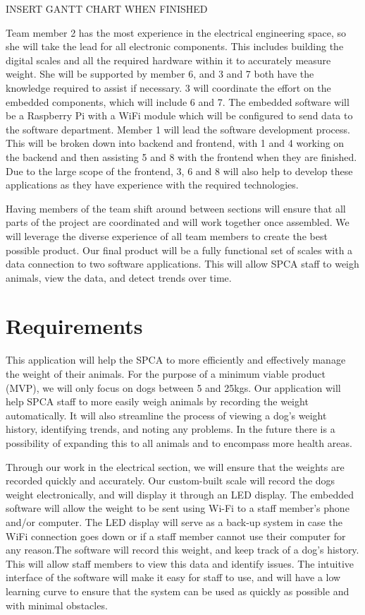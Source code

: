 INSERT GANTT CHART WHEN FINISHED

Team member 2 has the most experience in the electrical engineering space, so she will take the lead for all electronic components. This includes building the digital scales and all the required hardware within it to accurately measure weight. She will be supported by member 6, and 3 and 7 both have the knowledge required to assist if necessary. 3 will coordinate the effort on the embedded components, which will include 6 and 7. The embedded software will be a Raspberry Pi with a WiFi module which will be configured to send data to the software department. Member 1 will lead the software development process. This will be broken down into backend and frontend, with 1 and 4 working on the backend and then assisting 5 and 8 with the frontend when they are finished. Due to the large scope of the frontend, 3, 6 and 8 will also help to develop these applications as they have experience with the required technologies. 

Having members of the team shift around between sections will ensure that all parts of the project are coordinated and will work together once assembled. We will leverage the diverse experience of all team members to create the best possible product. Our final product will be a fully functional set of scales with a data connection to two software applications. This will allow SPCA staff to weigh animals, view the data, and detect trends over time. 



\chapter{Requirements}

This application will help the SPCA to more efficiently and effectively manage the weight of their animals. For the purpose of a minimum viable product (MVP), we will only focus on dogs between 5 and 25kgs. Our application will help SPCA staff to more easily weigh animals by recording the weight automatically. It will also streamline the process of viewing a dog’s weight history, identifying trends, and noting any problems. In the future there is a possibility of expanding this to all animals and to encompass more health areas. 

Through our work in the electrical section, we will ensure that the weights are recorded quickly and accurately. Our custom-built scale will record the dogs weight electronically, and will display it through an LED display. The embedded software will allow the weight to be sent using Wi-Fi to a staff member’s phone and/or computer. The LED display will serve as a back-up system in case the WiFi connection goes down or if a staff member cannot use their computer for any reason.The software will record this weight, and keep track of a dog’s history. This will allow staff members to view this data and identify issues. The intuitive interface of the software will make it easy for staff to use, and will have a low learning curve to ensure that the system can be used as quickly as possible and with minimal obstacles. 



